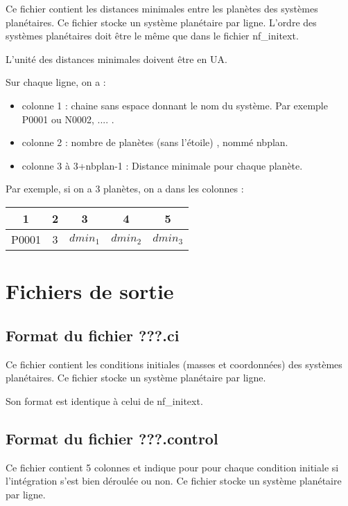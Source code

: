 \documentclass[11pt]{article}
\begin{document}
Ce fichier contient les distances minimales entre les plan\`etes des syst\`emes plan\'etaires. 
Ce fichier stocke un syst\`eme plan\'etaire par ligne. L'ordre des syst\`emes plan\'etaires doit \^etre le m\^eme que dans le fichier nf\_initext.

L'unit\'e des distances minimales doivent \^etre en UA.

Sur chaque ligne, on a :
\begin{itemize}
\item colonne 1 : chaine sans espace donnant le nom du syst\`eme. Par exemple P0001 ou N0002, .... .
\item colonne 2 : nombre de plan\`etes (sans l'\'etoile) , nomm\'e nbplan.
\item colonne 3 \`a 3+nbplan-1 : Distance minimale pour chaque plan\`ete. 
\end{itemize}

 Par exemple, si on a 3 plan\`etes, on a dans les colonnes :
 
\begin{tabular}{|c|c|c|c|c|} \hline
1 &  2 &  3 & 4 & 5  \\ \hline
P0001 & 3 & $dmin_{1}$  & $dmin_{2}$ & $dmin_{3}$\\    \hline
\end{tabular}


\section{Fichiers de sortie}

\subsection{Format du fichier {\bf ???.ci} }

Ce fichier contient les conditions initiales (masses et coordonn\'ees) des syst\`emes plan\'etaires. 
Ce fichier stocke un syst\`eme plan\'etaire par ligne.

Son format est identique \`a   celui de nf\_initext.

\subsection{Format du fichier {\bf ???.control} }

Ce fichier contient 5 colonnes et indique pour pour chaque condition initiale si l'int\'egration s'est bien d\'eroul\'ee ou non.
Ce fichier stocke un syst\`eme plan\'etaire par ligne.
\end{document}
